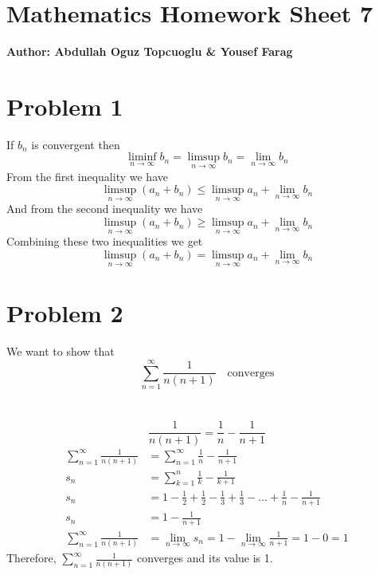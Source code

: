 \documentclass{article}
\begin{document}
\section*{\huge Mathematics Homework Sheet 7}
\begin{flushright}
   \textbf{Author: Abdullah Oguz Topcuoglu \& Yousef Farag}
\end{flushright}

\section*{Problem 1}


If \(b_n\) is convergent then
\[
   \liminf_{n \rightarrow \infty} b_n = \limsup_{n \rightarrow \infty} b_n = \lim_{n \rightarrow \infty} b_n
\]
From the first inequality we have
\[
   \limsup_{n \rightarrow \infty} (a_n + b_n) \leq \limsup_{n \rightarrow \infty} a_n + \lim_{n \rightarrow \infty} b_n
\]
And from the second inequality we have
\[
   \limsup_{n \rightarrow \infty} (a_n + b_n) \geq \limsup_{n \rightarrow \infty} a_n + \lim_{n \rightarrow \infty} b_n
\]
Combining these two inequalities we get
\[
   \limsup_{n \rightarrow \infty} (a_n + b_n) = \limsup_{n \rightarrow \infty} a_n + \lim_{n \rightarrow \infty} b_n
\]

\section*{Problem 2}
We want to show that
\[
   \sum_{n=1}^{\infty} \frac{1}{n(n+1)} \quad \text{converges}
\]
\\
\\
\[
   \frac{1}{n(n+1)} = \frac{1}{n} - \frac{1}{n+1}
\]
\begin{align*}
   \sum_{n=1}^{\infty} \frac{1}{n(n+1)} &= \sum_{n=1}^{\infty} \frac{1}{n} - \frac{1}{n+1} \\
   s_n &= \sum_{k=1}^n \frac{1}{k} - \frac{1}{k+1} \\
   s_n &= 1 - \frac{1}{2} + \frac{1}{2} - \frac{1}{3} + \frac{1}{3} - \ldots + \frac{1}{n} - \frac{1}{n+1} \\
   s_n &= 1 - \frac{1}{n+1} \\
   \sum_{n=1}^{\infty} \frac{1}{n(n+1)} &= \lim_{n \rightarrow \infty} s_n = 1 - \lim_{n \rightarrow \infty} \frac{1}{n+1} = 1 - 0 = 1
\end{align*}
Therefore, \(\sum_{n=1}^{\infty} \frac{1}{n(n+1)}\) converges and its value is 1. \\
\end{document}
